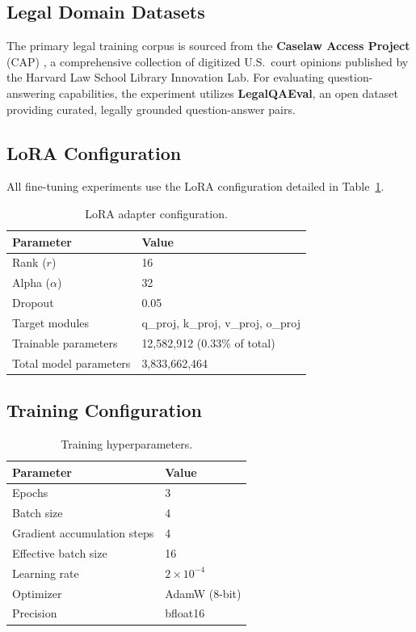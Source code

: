 \documentclass[12pt, letterpaper]{article}
\begin{document}
\subsection{Legal Domain Datasets}

The primary legal training corpus is sourced from the \textbf{Caselaw Access Project} (CAP) \citep{caselaw2018}, a comprehensive collection of digitized U.S.\ court opinions published by the Harvard Law School Library Innovation Lab. For evaluating question-answering capabilities, the experiment utilizes \textbf{LegalQAEval}, an open dataset providing curated, legally grounded question-answer pairs.

\subsection{LoRA Configuration}

All fine-tuning experiments use the LoRA \citep{hu2022lora} configuration detailed in Table~\ref{tab:lora-config}.

\begin{table}[H]
\centering
\caption{LoRA adapter configuration.}
\label{tab:lora-config}
\begin{tabular}{ll}
\toprule
\textbf{Parameter}         & \textbf{Value} \\
\midrule
Rank ($r$)                 & 16 \\
Alpha ($\alpha$)           & 32 \\
Dropout                    & 0.05 \\
Target modules             & q\_proj, k\_proj, v\_proj, o\_proj \\
Trainable parameters       & 12,582,912 (0.33\% of total) \\
Total model parameters     & 3,833,662,464 \\
\bottomrule
\end{tabular}
\end{table}

\subsection{Training Configuration}

\begin{table}[H]
\centering
\caption{Training hyperparameters.}
\label{tab:training-config}
\begin{tabular}{ll}
\toprule
\textbf{Parameter}              & \textbf{Value} \\
\midrule
Epochs                          & 3 \\
Batch size                      & 4 \\
Gradient accumulation steps     & 4 \\
Effective batch size            & 16 \\
Learning rate                   & $2 \times 10^{-4}$ \\
Optimizer                       & AdamW (8-bit) \\
Precision                       & bfloat16 \\
\bottomrule
\end{tabular}
\end{table}
\end{document}
